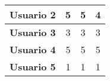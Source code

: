 \begin{table}[H]
{\begin{tabular}{c|ccc|}
            \multicolumn{1}{|c|}{\textbf{Usuario 2}} & \multicolumn{1}{c|}{5}                                                                                                                                                       & \multicolumn{1}{c|}{5}                                                                                                                                                                                & 4                                                                                                                                                                                                                    \\ \hline
            \multicolumn{1}{|c|}{\textbf{Usuario 3}} & \multicolumn{1}{c|}{3}                                                                                                                                                       & \multicolumn{1}{c|}{3}                                                                                                                                                                                & 3                                                                                                                                                                                                                    \\ \hline
            \multicolumn{1}{|c|}{\textbf{Usuario 4}} & \multicolumn{1}{c|}{5}                                                                                                                                                       & \multicolumn{1}{c|}{5}                                                                                                                                                                                & 5                                                                                                                                                                                                                    \\ \hline
            \multicolumn{1}{|c|}{\textbf{Usuario 5}} & \multicolumn{1}{c|}{1}                                                                                                                                                       & \multicolumn{1}{c|}{1}                                                                                                                                                                                & 1                                                                                                                                                                                                                    \\ \hline

\end{tabular}}
\end{table}
